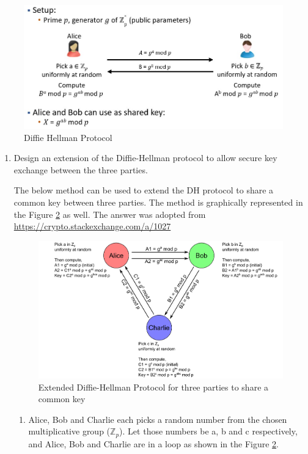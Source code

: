 \documentclass[11pt,letterpaper]{article}
\newenvironment{answer}{\em \color{blue} \begin{adjustwidth}{1cm}{1cm}}{\end{adjustwidth}}
\begin{document}
	\begin{figure}[h]
		\centering
		\includegraphics[width=0.7\columnwidth]{images/dh-protocol.jpg}
		\caption{Diffie Hellman Protocol} \label{fig:dh-protocol}
	\end{figure}
\pagebreak
	\begin{enumerate}
		\item Design an extension of the Diffie-Hellman protocol to allow secure key exchange between the three parties.\\
		
		\begin{answer}
			
			The below method can be used to extend the DH protocol to share a common key between three parties. The method is graphically represented in the Figure \ref{fig:dh-protocol-extension} as well. The answer was adopted from \url{https://crypto.stackexchange.com/a/1027}
			
			\begin{figure}[H]
				\centering
				\includegraphics[width=0.9\columnwidth]{images/3-parties-1-key.png}
				\caption{Extended Diffie-Hellman Protocol for three parties to share a common key} \label{fig:dh-protocol-extension}
			\end{figure}
		
		\begin{enumerate}
			\item Alice, Bob and Charlie each picks a random number from the chosen multiplicative group ($\mathbb{Z}_p$). Let those numbers be a, b and c respectively, and Alice, Bob and Charlie are in a loop as shown in the Figure \ref{fig:dh-protocol-extension}.
			

\end{enumerate}
\end{answer}
\end{enumerate}
\end{document}
